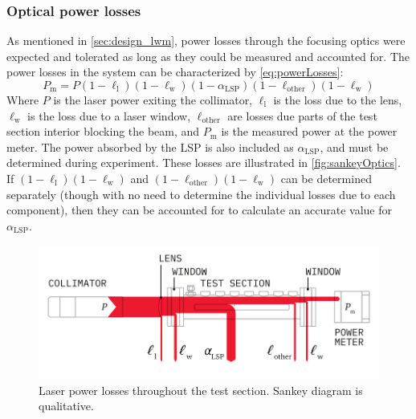             \subsubsection*{Optical power losses}
                As mentioned in \autoref{sec:design_lwm}, power losses through the focusing optics were expected and tolerated as long as they could be measured and accounted for. The power losses in the system can be characterized by \autoref{eq:powerLosses}:
                \begin{equation}
                    P_\mathrm{m} = P(1-\ell_\mathrm{l})(1-\ell_\mathrm{w})(1-\alpha_\mathrm{LSP})(1-\ell_\mathrm{other})(1-\ell_\mathrm{w})
                    \label{eq:powerLosses}
                \end{equation}
                Where $P$ is the laser power exiting the collimator, $\ell_\mathrm{l}$ is the loss due to the lens, $\ell_\mathrm{w}$ is the loss due to a laser window, $\ell_\mathrm{other}$ are losses due parts of the test section interior blocking the beam, and $P_\mathrm{m}$ is the measured power at the power meter. The power absorbed by the LSP is also included as $\alpha_\mathrm{LSP}$, and must be determined during experiment. These losses are illustrated in \autoref{fig:sankeyOptics}. If $(1-\ell_\mathrm{l})(1-\ell_\mathrm{w})$ and $(1-\ell_\mathrm{other})(1-\ell_\mathrm{w})$ can be determined separately (though with no need to determine the individual losses due to each component), then they can be accounted for to calculate an accurate value for $\alpha_\mathrm{LSP}$.

                \begin{figure}[h]
                    \centering
                    \includegraphics[]{assets/3 design/sankeyOptics.pdf}
                    \caption[Laser power losses throughout the test section]{Laser power losses throughout the test section. Sankey diagram is qualitative.}
                    \label{fig:sankeyOptics}
                \end{figure}

